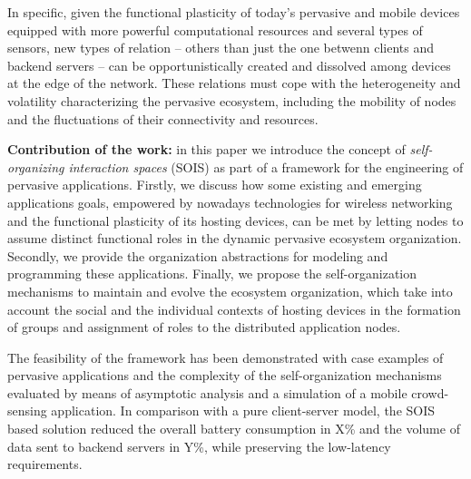 In specific, given the functional plasticity of today's pervasive and mobile devices equipped with more powerful computational resources and several types of sensors, 
new types of relation -- others than just the one betwenn clients and backend servers -- can be opportunistically created and dissolved among devices at the edge of the network. These relations must cope with the heterogeneity and volatility characterizing the pervasive ecosystem, including the mobility of nodes and the fluctuations of their connectivity and resources. 


\textbf{Contribution of the work:} 
in this paper we introduce the concept of \textit{self-organizing interaction spaces} (SOIS) as part of a framework for the engineering of pervasive applications. 
Firstly, we discuss how some existing and emerging applications goals, empowered by nowadays technologies for wireless networking and the functional plasticity of its hosting devices, can be met by letting nodes to assume distinct functional roles in the dynamic pervasive ecosystem organization. 
Secondly, we provide the organization abstractions for modeling and programming these applications. Finally, we propose the self-organization mechanisms to maintain and evolve the ecosystem organization, which take into account the social and the individual contexts of hosting devices in the formation of groups and assignment of roles to the  distributed application nodes.

The feasibility of the framework has been demonstrated with case examples of pervasive applications and the complexity of the self-organization mechanisms evaluated by means of asymptotic analysis and a simulation of a mobile crowd-sensing application.
In comparison with a pure client-server model, the SOIS based solution reduced the overall battery consumption in X\% and the volume of data sent to backend servers in Y\%, while preserving the low-latency requirements.

